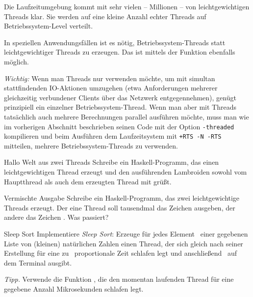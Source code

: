 \documentclass{uebblatt}
\begin{document}
Die Laufzeitumgebung kommt mit sehr vielen -- Millionen -- von
leichtgewichtigen Threads klar. Sie werden auf eine kleine Anzahl
echter Threads auf Betriebssystem-Level verteilt.

In speziellen Anwendungsfällen ist es nötig, Betriebssystem-Threads statt
leichtgewichtiger Threads zu erzeugen. Das ist mittels der Funktion
 ebenfalls möglich.

\emph{Wichtig:} Wenn man Threads nur verwenden möchte, um mit simultan
stattfindenden IO-Aktionen umzugehen (etwa Anforderungen mehrerer gleichzeitig
verbundener Clients über das Netzwerk entgegennehmen), genügt prinzipiell ein
einzelner Betriebssystem-Thread. Wenn man aber mit Threads
tatsächlich auch mehrere Berechnungen parallel ausführen möchte, muss man
wie im vorherigen Abschnitt beschrieben seinen Code mit der Option
\texttt{-threaded} kompilieren und beim Ausführen
dem Laufzeitsystem mit \texttt{+RTS -N -RTS} mitteilen, mehrere
Betriebssystem-Threads zu verwenden.

\begin{aufgabe}{Hallo Welt aus zwei Threads}
Schreibe ein Haskell-Programm, das einen leichtgewichtigen Thread erzeugt
und den ausführenden Lambroiden sowohl vom Hauptthread als auch dem erzeugten
Thread mit  grüßt.
\end{aufgabe}

\begin{aufgabe}{Vermischte Ausgabe}
Schreibe ein Haskell-Programm, das zwei leichtgewichtige Threads erzeugt. Der
eine Thread soll tausendmal das Zeichen  ausgeben, der
andere das Zeichen . Was passiert?
\end{aufgabe}

\begin{aufgabe}{Sleep Sort}
Implementiere \emph{Sleep Sort}: Erzeuge für jedes
Element~ einer gegebenen Liste von (kleinen) natürlichen
Zahlen einen Thread, der sich gleich nach seiner Erstellung für eine
zu~ proportionale Zeit schlafen legt und
anschließend~ auf dem Terminal ausgibt.

{\scriptsize\emph{Tipp.} Verwende die Funktion , die den momentan laufenden Thread für eine gegebene Anzahl
Mikrosekunden schlafen legt.\par}
\end{aufgabe}
\end{document}
